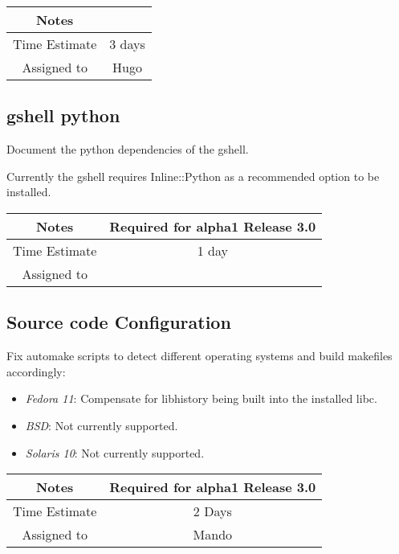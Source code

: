 \documentclass[12pt]{article}
\begin{document}
{
  \vspace{5mm}
  \centering
  \begin{tabular}{|c|c|}
    \hline
    Notes
    & \\
    \hline
    Time Estimate
    & 3 days \\
    \hline
    Assigned to
    & Hugo \\
    \hline
  \end{tabular}
}


\subsection{gshell python}

Document the python dependencies of the gshell.

Currently the gshell requires Inline::Python as a recommended option
to be installed.

{
  \vspace{5mm}
  \centering
  \begin{tabular}{|c|c|}
    \hline
    Notes
    & Required for alpha1 Release 3.0 \\
    \hline
    Time Estimate
    & 1 day \\
    \hline
    Assigned to
    & \\
    \hline
  \end{tabular}
}


\subsection{Source code Configuration}

Fix automake scripts to detect different operating systems 
and build makefiles accordingly:


\begin{itemize}
\item {\it Fedora 11}: Compensate for libhistory being built into the
  installed libc.
\item {\it BSD}: Not currently supported.
\item {\it Solaris 10}: Not currently supported.
\end{itemize}

{
  \vspace{5mm}
  \centering
  \begin{tabular}{|c|c|}
    \hline
    Notes
    & Required for alpha1 Release 3.0 \\
    \hline
    Time Estimate
    & 2 Days\\
    \hline
    Assigned to
    & Mando \\
    \hline
  \end{tabular}
}
\end{document}
